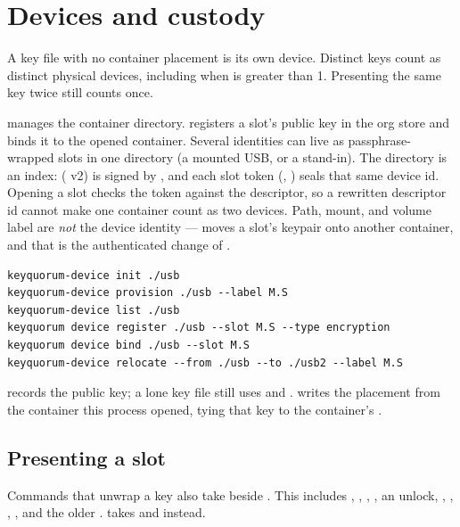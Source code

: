 \section{Devices and custody}
\label{sec:devices-and-custody}

A key file with no container placement is its own device. Distinct
 keys count as distinct physical devices, including when
 is greater than 1. Presenting the same
key twice still counts once.

 manages the container directory.  registers a slot's public key in the org store and binds it to the
opened container. Several identities can live as passphrase-wrapped slots
in one directory (a mounted USB, or a stand-in). The directory is an index:
 ( v2) is signed by , and each
slot token (, ) seals that same device id. Opening a
slot checks the token against the descriptor, so a rewritten descriptor id
cannot make one container count as two devices. Path, mount, and volume
label are \emph{not} the device identity ---  moves a slot's
keypair onto another container, and that is the authenticated change of
.

\begin{lstlisting}
keyquorum-device init ./usb
keyquorum-device provision ./usb --label M.S
keyquorum-device list ./usb
keyquorum device register ./usb --slot M.S --type encryption
keyquorum device bind ./usb --slot M.S
keyquorum-device relocate --from ./usb --to ./usb2 --label M.S
\end{lstlisting}

 records the public key; a lone key file still uses
 and .  writes the placement
from the container this process opened, tying that key to the container's
.

\subsection{Presenting a slot}

Commands that unwrap a key also take  beside
. This includes , ,
, , an  unlock,
, , ,
, and the older .  takes  and
 instead.

